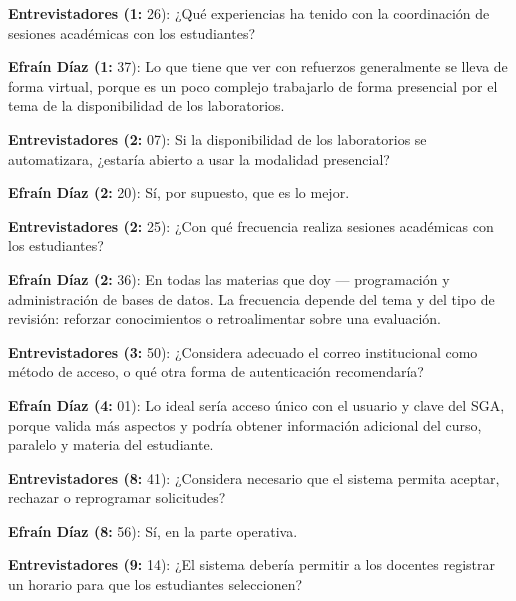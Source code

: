 \noindent\textbf{Entrevistadores (1:} 26): ¿Qué experiencias ha tenido con la coordinación de sesiones académicas con los estudiantes?\par\smallskip

\noindent\textbf{Efraín Díaz (1:} 37): Lo que tiene que ver con refuerzos generalmente se lleva de forma virtual, porque es un poco complejo trabajarlo de forma presencial por el tema de la disponibilidad de los laboratorios.\par\smallskip

\noindent\textbf{Entrevistadores (2:} 07): Si la disponibilidad de los laboratorios se automatizara, ¿estaría abierto a usar la modalidad presencial?\par\smallskip

\noindent\textbf{Efraín Díaz (2:} 20): Sí, por supuesto, que es lo mejor.\par\smallskip

\noindent\textbf{Entrevistadores (2:} 25): ¿Con qué frecuencia realiza sesiones académicas con los estudiantes?\par\smallskip

\noindent\textbf{Efraín Díaz (2:} 36): En todas las materias que doy — programación y administración de bases de datos. La frecuencia depende del tema y del tipo de revisión: reforzar conocimientos o retroalimentar sobre una evaluación.\par\smallskip

\noindent\textbf{Entrevistadores (3:} 50): ¿Considera adecuado el correo institucional como método de acceso, o qué otra forma de autenticación recomendaría?\par\smallskip

\noindent\textbf{Efraín Díaz (4:} 01): Lo ideal sería acceso único con el usuario y clave del SGA, porque valida más aspectos y podría obtener información adicional del curso, paralelo y materia del estudiante.\par\smallskip

\noindent\textbf{Entrevistadores (8:} 41): ¿Considera necesario que el sistema permita aceptar, rechazar o reprogramar solicitudes?\par\smallskip

\noindent\textbf{Efraín Díaz (8:} 56): Sí, en la parte operativa.\par\smallskip

\noindent\textbf{Entrevistadores (9:} 14): ¿El sistema debería permitir a los docentes registrar un horario para que los estudiantes seleccionen?\par\smallskip

